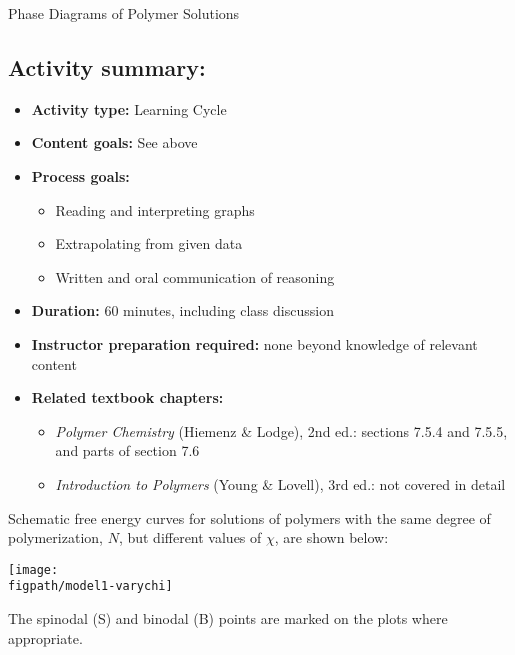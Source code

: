 \begin{activity}{Phase Diagrams of Polymer Solutions}
\begin{instructornotes}
	\subsection*{Activity summary:}
	\begin{itemize}
		\item \textbf{Activity type:} Learning Cycle
		\item \textbf{Content goals:} See above %
		\item \textbf{Process goals:} %
			\begin{itemize}
				\item Reading and interpreting graphs
				\item Extrapolating from given data
				\item Written and oral communication of reasoning
			\end{itemize}
		\item \textbf{Duration:} 60 minutes, including class discussion
		\item \textbf{Instructor preparation required:} none beyond knowledge of relevant content
		\item \textbf{Related textbook chapters:}
			\begin{itemize}
				\item \emph{Polymer Chemistry} (Hiemenz \& Lodge), 2nd ed.: sections 7.5.4 and 7.5.5, and parts of section 7.6
				\item \emph{Introduction to Polymers} (Young \& Lovell), 3rd ed.: not covered in detail
			\end{itemize}
	\end{itemize}

\end{instructornotes}



\begin{model}
\label{\labelbase:mdl:spinodalbinodal}

	Schematic free energy curves for solutions of polymers with the same degree of polymerization, $N$, but different values of $\chi$, are shown below:
	
	\centerline{\texttt{[image: \\figpath/model1-varychi]}}
	
	The spinodal (S) and binodal (B) points are marked on the plots where appropriate.
\end{model}


\end{activity}
